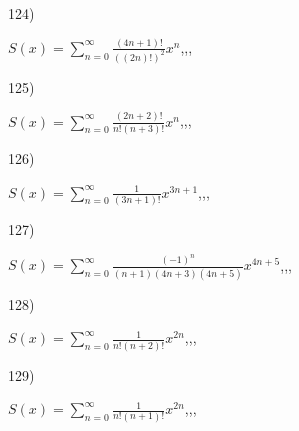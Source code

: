 \documentclass[11pt, ukrainian]{article}
\begin{document}
\par
\vspace{0.9cm}
124) \space 
{%
{$S(x)=\sum\limits_{n=0}^{\infty}{\frac{(4n+1)!}{((2n)!)^2}}{x^{{n}}}$},,, \par \smallskip  
}
\par
\vspace{0.9cm}
125) \space 
{%
{$S(x)=\sum\limits_{n=0}^{\infty}{\frac{(2n+2)!}{n!(n+3)!}}{x^{n}}$},,, \par \smallskip  
}
\par
\vspace{0.9cm}
126) \space 
{%
{$S(x)=\sum\limits_{n=0}^{\infty}{\frac{1}{(3n+1)!}}{x^{{3n+1}}}$},,, \par \smallskip  
}
\par
\vspace{0.9cm}
127) \space 
{%
{$S(x)=\sum\limits_{n=0}^{\infty}{\frac{(-1)^n}{(n+1)(4n+3)(4n+5)}}{x^{{4n+5}}}$},,, \par \smallskip  
}
\par
\vspace{0.9cm}
128) \space 
{%
{$S(x)=\sum\limits_{n=0}^{\infty}{\frac{1}{n!(n+2)!}}{x^{{2n}}}$},,, \par \smallskip  
}
\par
\vspace{0.9cm}
129) \space 
{%
{$S(x)=\sum\limits_{n=0}^{\infty}{\frac{1}{n!(n+1)!}}{x^{{2n}}}$},,, \par \smallskip  
}
\end{document}
